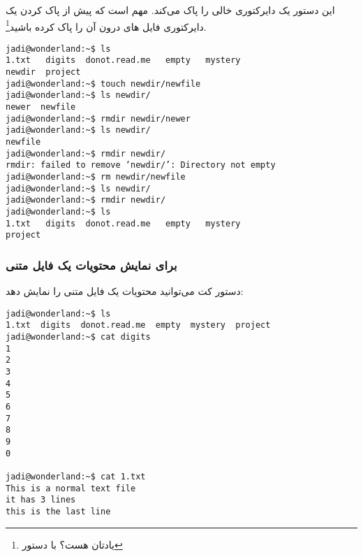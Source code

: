 \subsubsection*{}
این دستور یک دایرکتوری خالی را پاک می‌کند. مهم است که پیش از پاک کردن یک دایرکتوری
فایل ‌های درون آن را پاک کرده باشید\footnote{یادتان هست؟ با دستور }.
\begin{frameng}
\begin{lstlisting}
jadi@wonderland:~$ ls 
1.txt	digits	donot.read.me	empty	mystery
newdir	project
jadi@wonderland:~$ touch newdir/newfile
jadi@wonderland:~$ ls newdir/
newer  newfile
jadi@wonderland:~$ rmdir newdir/newer
jadi@wonderland:~$ ls newdir/
newfile
jadi@wonderland:~$ rmdir newdir/
rmdir: failed to remove ‘newdir/’: Directory not empty
jadi@wonderland:~$ rm newdir/newfile 
jadi@wonderland:~$ ls newdir/
jadi@wonderland:~$ rmdir newdir/
jadi@wonderland:~$ ls
1.txt	digits	donot.read.me	empty	mystery
project
\end{lstlisting}
\end{frameng}
\subsubsection*{ برای نمایش محتویات یک فایل متنی}
دستور کت می‌توانید محتویات یک فایل متنی را نمایش دهد:
\begin{frameng}
\begin{lstlisting}
jadi@wonderland:~$ ls 
1.txt  digits  donot.read.me  empty  mystery  project
jadi@wonderland:~$ cat digits 
1
2
3
4
5
6
7
8
9
0

jadi@wonderland:~$ cat 1.txt 
This is a normal text file
it has 3 lines
this is the last line
\end{lstlisting}
\end{frameng}

